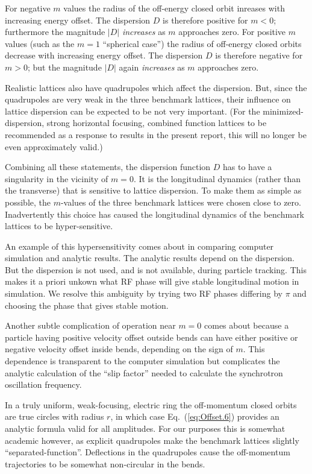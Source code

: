 \documentclass[]{article}
\begin{document}
For negative $m$ values the radius of the off-energy closed orbit 
inreases with increasing energy offset. The dispersion $D$ is 
therefore positive for $m<0$; furthermore the magnitude $|D|$ 
\emph{increases} as $m$ approaches zero. 
For positive $m$ values (such as the $m=1$ ``spherical case'')
the radius of off-energy closed orbits decrease with increasing
energy offset. The dispersion $D$ is therefore negative for $m>0$;
but the magnitude $|D|$ again \emph{increases} as $m$ approaches zero. 

Realistic lattices also have quadrupoles which affect the dispersion. 
But, since the quadrupoles are very weak in the three benchmark 
lattices, their influence on lattice dispersion can be expected to
be not very important. (For the minimized-dispersion, strong horizontal
focusing, combined function lattices to be recommended as a 
response to results in the present report,
this will no longer be even approximately valid.)  

Combining all these statements, the dispersion function $D$ has to
have a singularity in the vicinity of $m=0$. It is the longitudinal
dynamics (rather than the transverse) that is sensitive to lattice
dispersion. To make them as simple as possible, the $m$-values of the 
three benchmark lattices were chosen close to zero.  Inadvertently this
choice has caused the longitudinal dynamics of the benchmark lattices
to be hyper-sensitive.

An example of this hypersensitivity comes about in comparing computer
simulation and analytic results. The analytic results depend on the
dispersion. But the dispersion is not used, and is not available, during 
particle tracking. This makes it a priori unkown what RF phase will give 
stable longitudinal motion in simulation. We resolve this ambiguity by 
trying two RF phases differing by $\pi$ and choosing the phase that 
gives stable motion.

Another subtle complication of operation near $m=0$ comes
about because a particle having positive velocity offset outside
bends can have either positive or negative velocity offset inside 
bends, depending on the sign of $m$. This dependence is transparent
to the computer simulation but complicates the analytic calculation
of the ``slip factor'' needed to calculate the synchrotron oscillation 
frequency. 
 
In a truly uniform, weak-focusing, electric
ring the off-momentum closed orbits are true circles
with radius $r$, in which case Eq.~(\ref{eq:Offset.6}) 
provides an analytic formula valid for all amplitudes.
For our purposes this is somewhat academic however, as
explicit quadrupoles make the benchmark lattices 
slightly ``separated-function''. Deflections in the 
quadrupoles cause the off-momentum trajectories to be 
somewhat non-circular in the bends. 
\end{document}
